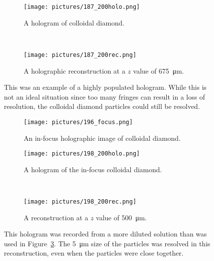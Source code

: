\clearpage


\begin{figure}[ht!]
    \begin{center}

        \begin{subfigure}[t]{0.4\textwidth}
            \label{fig:187_200holo}
            \texttt{[image: pictures/187\_200holo.png]}
            \caption{A hologram of colloidal diamond.}
        \end{subfigure}
        \\
        \begin{subfigure}[t]{\textwidth}
            \label{fig:187_200rec}
            \texttt{[image: pictures/187\_200rec.png]}
            \caption{A holographic reconstruction at a $z$ value of \SI{675}{\micro\meter}.}
        \end{subfigure}


    \end{center}
    \caption{%
        This was an example of a highly populated hologram. While this is not
        an ideal situation since too many fringes can result in a loss of
        resolution, the colloidal diamond particles could still be
        resolved.
    }%
    \label{fig:187_200}
\end{figure}

\clearpage


\begin{figure}[ht!]
    \begin{center}

        \begin{subfigure}[t]{0.4\textwidth}
            \label{fig:196_focus}
            \texttt{[image: pictures/196\_focus.png]}
            \caption{An in-focus holographic image of colloidal diamond.}
        \end{subfigure}
                \hspace*{\fill}
        \begin{subfigure}[t]{0.4\textwidth}
            \label{fig:198_200holo}
            \texttt{[image: pictures/198\_200holo.png]}
            \caption{A hologram of the in-focus colloidal diamond.}
        \end{subfigure}
        \\
        \begin{subfigure}[t]{\textwidth}
            \label{fig:198_200rec}
            \texttt{[image: pictures/198\_200rec.png]}
            \caption{A reconstruction at a $z$ value of \SI{500}{\micro\meter}.}
        \end{subfigure}


    \end{center}
    \caption{%
        This hologram was recorded from a more diluted solution than was used
        in
        Figure~\ref{fig:187_200}.
        The \SI{5}{\micro\meter} size of the
        particles was resolved in this reconstruction, even when the particles
        were close together.
    }%
    \label{fig:198_200}
\end{figure}

